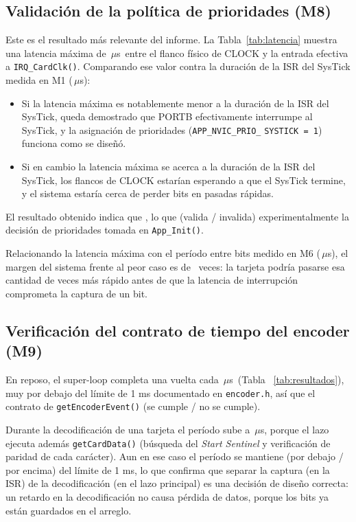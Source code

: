 \documentclass[11pt,a4paper]{article}
\newcommand{\dato}[1][2cm]{\underline{\hspace{#1}}}
\newcommand{\us}{\ensuremath{\mu}s}
\begin{document}
\subsection{Validación de la política de prioridades (M8)}

Este es el resultado más relevante del informe. La Tabla~\ref{tab:latencia}
muestra una latencia máxima de \dato\,\us\ entre el flanco físico de CLOCK
y la entrada efectiva a \texttt{IRQ\_CardClk()}. Comparando ese valor contra
la duración de la ISR del SysTick medida en M1 (\dato\,\us):

\begin{itemize}
  \item Si la latencia máxima es notablemente menor a la duración de la ISR
        del SysTick, queda demostrado que PORTB efectivamente interrumpe al
        SysTick, y la asignación de prioridades (\texttt{APP\_NVIC\_PRIO\_}
        \texttt{SYSTICK = 1}) funciona como se diseñó.
  \item Si en cambio la latencia máxima se acerca a la duración de la ISR
        del SysTick, los flancos de CLOCK estarían esperando a que el
        SysTick termine, y el sistema estaría cerca de perder bits en
        pasadas rápidas.
\end{itemize}

El resultado obtenido indica que \dato[7cm], lo que \dato{} (valida /
invalida) experimentalmente la decisión de prioridades tomada en
\texttt{App\_Init()}.

Relacionando la latencia máxima con el período entre bits medido en M6
(\dato\,\us), el margen del sistema frente al peor caso es de
\dato\ veces: la tarjeta podría pasarse esa cantidad de veces más rápido
antes de que la latencia de interrupción comprometa la captura de un bit.

\subsection{Verificación del contrato de tiempo del encoder (M9)}

En reposo, el super-loop completa una vuelta cada \dato\,\us\ (Tabla~
\ref{tab:resultados}), muy por debajo del límite de 1 ms documentado en
\texttt{encoder.h}, así que el contrato de \texttt{getEncoderEvent()}
\dato{} (se cumple / no se cumple).

Durante la decodificación de una tarjeta el período sube a \dato\,\us,
porque el lazo ejecuta además \texttt{getCardData()} (búsqueda del
\textit{Start Sentinel} y verificación de paridad de cada carácter). Aun en
ese caso el período se mantiene \dato{} (por debajo / por encima) del
límite de 1 ms, lo que confirma que separar la captura (en la ISR) de la
decodificación (en el lazo principal) es una decisión de diseño correcta:
un retardo en la decodificación no causa pérdida de datos, porque los bits
ya están guardados en el arreglo.
\end{document}
